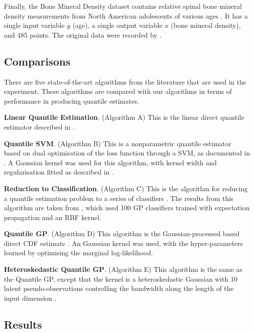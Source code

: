 \documentclass[twoside]{article} \usepackage{aistats2017}
\theoremstyle{definition}
\theoremstyle{theorem}
\begin{document}
		Finally, the Bone Mineral Density dataset contains relative spinal bone mineral density measurements from North American adolescents of various ages \citep{hastie2005the}. It has a single input variable $y$ (age), a single output variable $x$ (bone mineral density), and 485 points. The original data were recorded by \cite{bachrach1999bone}.


	\subsection{Comparisons}
	\label{sec:experiments:comparison}
	
		There are five state-of-the-art algorithms from the literature that are used in the experiment. These algorithms are compared with our algorithms in terms of performance in producing quantile estimates.
		
		\textbf{Linear Quantile Estimation}. (Algorithm A) This is the linear direct quantile estimator described in \cite{koenker1978regression}.
		
		\textbf{Quantile SVM}. (Algorithm B) This is a nonparametric quantile estimator based on dual optimisation of the loss function through a SVM, as documented in \cite{takeuchi2006nonparametric}. A Gaussian kernel was used for this algorithm, with kernel width and regularisation fitted as described in \cite{quadrianto2009kernel}.
		
		\textbf{Reduction to Classification}. (Algorithm C) This is the algorithm for reducing a quantile estimation problem to a series of classifiers \citep{langford2012predicting}. The results from this algorithm are taken from \cite{quadrianto2009kernel}, which used 100 GP classifiers trained with expectation propagation and an RBF kernel.
		
		\textbf{Quantile GP}. (Algorithm D) This algorithm is the Gaussian-processed based direct CDF estimate \cite{quadrianto2009kernel}. An Gaussian kernel was used, with the hyper-parameters learned by optimising the marginal log-likelihood.
		
		\textbf{Heteroskedastic Quantile GP}. (Algorithm E) This algorithm is the same as the Quantile GP, except that the kernel is a heteroskedastic Gaussian with 10 latent pseudo-observations controlling the bandwidth along the length of the input dimension \citep{quadrianto2009kernel}. 
		
	\subsection{Results}
	\label{sec:experiments:results}
	
\end{document}
